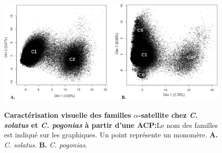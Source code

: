 \documentclass[12pt,a4paper]{article}
\begin{document}
		\begin{figure}	
			\includegraphics[scale=0.4]{img/ACP_experimental.png}  \\
			\caption{\textbf{Caractérisation visuelle des familles $\alpha$-satellite chez \textit{C. solatus} et \textit{C. pogonias} à partir d'une ACP:}Le nom des familles est indiqué sur les graphiques. Un point représente un monomère. \textbf{A.} \textit{C. solatus}. \textbf{B.} \textit{C. pogonias}.}
			\label{fig:ACP_exp} 
	\end{figure}	
	
\end{document}
